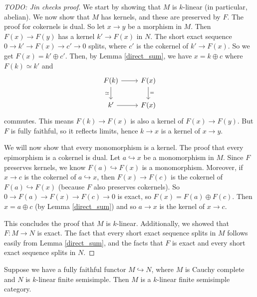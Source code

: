 \begin{proof}
  [TODO: Jin checks proof]

  We start by showing that $M$ is $k$-linear (in particular, abelian). We now
  show that $M$ has kernels, and these are preserved by $F$. The proof for
  cokernels is dual. So let $x\to y$ be a morphism in $M$. Then $F(x)\to F(y)$ has
  a kernel $k'\to F(x)$ in $N$. The short exact sequence $0\to k'\to F(x)\to c'\to 0$
  splits, where $c'$ is the cokernel of $k'\to F(x)$. So we get $F(x)=k'\oplus c'$.
  Then, by Lemma \ref{direct_sum}, we have $x=k\oplus c$ where $F(k)\simeq k'$ and
  \[
    \begin{tikzcd}
      {F(k)} & {F(x)} \\
      {k'} & {F(x)} \arrow[from=1-1, to=1-2] \arrow["\simeq"', from=1-1, to=2-1] \arrow["{=}", from=1-2, to=2-2] \arrow[from=2-1, to=2-2]
    \end{tikzcd}
  \]
  commutes. This means $F(k)\to F(x)$ is also a kernel of $F(x)\to F(y)$. But
  $F$ is fully faithful, so it reflects limits, hence $k\to x$ is a kernel of
  $x\to y$.

  We will now show that every monomorphism is a kernel. The proof that every
  epimorphism is a cokernel is dual. Let $a\hookrightarrow x$ be a
  monomorphism in $M$. Since $F$ preserves kernels, we know
  $F(a)\hookrightarrow F(x)$ is a monomorphism. Moreover, if $x\to c$ is the
  cokernel of $a\hookrightarrow x$, then $F(x)\to F(c)$ is the cokernel of
  $F(a)\hookrightarrow F(x)$ (because $F$ also preserves cokernels). So $0\to F(a)\to F(x)\to F(c)\to 0$ is exact, so
  $F(x)=F(a)\oplus F(c)$. Then $x=a\oplus c$ (by Lemma \ref{direct_sum}) and
  so $a\to x$ is the kernel of $x\to c$.

  This concludes the proof that $M$ is $k$-linear. Additionally, we showed that $F:M\to N$ is exact. The fact that every short exact sequence splits in $M$ follows easily from
  Lemma \ref{direct_sum}, and the facts that $F$ is exact and every short
  exact sequence splits in $N$.
\end{proof}

\begin{proposition}\label{cau_semi}
  Suppose we have a fully faithful functor $M\hookrightarrow N$,
  where $M$ is Cauchy complete and $N$ is $k$-linear finite semisimple. Then
  $M$ is a $k$-linear finite semisimple category.
\end{proposition}

